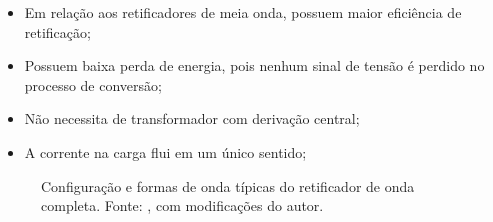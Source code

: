 \begin{itemize}
    \item Em relação aos retificadores de meia onda, possuem maior eficiência de retificação;
    
    \item Possuem baixa perda de energia, pois nenhum sinal de tensão é perdido no processo de conversão;
    
    \item Não necessita de transformador com derivação central;
    
    \item A corrente na carga flui em um único sentido;
\end{itemize}


\begin{figure}[H]
\centering
{}
\qquad
{}
\caption{Configuração e formas de onda típicas do retificador de onda completa. Fonte: , com modificações do autor.}
\label{fig:globfig}
\end{figure}

